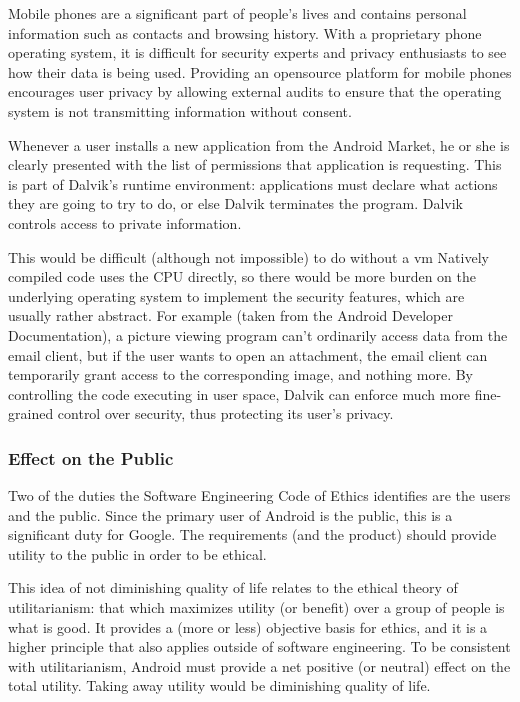 \documentclass[11pt]{article}
\begin{document}
\begin{multicols}{2}
Mobile phones are a significant part of people's lives and contains personal
information such as contacts and browsing history.  With a proprietary phone
operating system, it is difficult for security experts and privacy enthusiasts
to see how their data is being used.  Providing an \gls{opensource} platform for
mobile phones encourages user privacy by allowing external audits to ensure that
the operating system is not transmitting information without consent.

Whenever a user installs a new application from the Android Market, he or she is
clearly presented with the list of permissions that application is requesting.
This is part of Dalvik's runtime environment: applications must declare what
actions they are going to try to do, or else Dalvik terminates the program.
Dalvik controls access to private information.

This would be difficult (although not impossible) to do without a \gls{vm}
Natively compiled code uses the CPU directly, so there would be more burden on
the underlying operating system to implement the security features, which are
usually rather abstract.  For example (taken from the Android Developer
Documentation), a picture viewing program can't ordinarily access data from the
email client, but if the user wants to open an attachment, the email client can
temporarily grant access to the corresponding image, and nothing more.  By
controlling the code executing in user space, Dalvik can enforce much more
fine-grained control over security, thus protecting its user's privacy.


\subsubsection{Effect on the Public} %
\label{ssub:public-effect}

Two of the duties the Software Engineering Code of Ethics identifies are the
users and the public.  Since the primary user of Android is the public, this is
a significant duty for Google.  The requirements (and the product) should
provide utility to the public in order to be ethical.

This idea of not diminishing quality of life relates to the ethical theory of
utilitarianism: that which maximizes utility (or benefit) over a group of people
is what is good.  It provides a (more or less) objective basis for ethics, and
it is a higher principle that also applies outside of software engineering.  To
be consistent with utilitarianism, Android must provide a net positive (or
neutral) effect on the total utility.  Taking away utility would be diminishing
quality of life.


\end{multicols}
\end{document}

